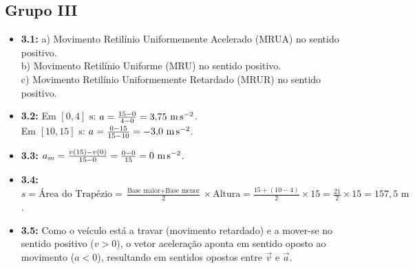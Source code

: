 \documentclass[11pt, a4paper]{article}
\begin{document}
\subsection*{Grupo III}
\begin{itemize}[leftmargin=1.5em]
  \item \textbf{3.1:} 
    a) Movimento Retilínio Uniformemente Acelerado (MRUA) no sentido positivo. \\
    b) Movimento Retilínio Uniforme (MRU) no sentido positivo. \\
    c) Movimento Retilínio Uniformemente Retardado (MRUR) no sentido positivo.
  \item \textbf{3.2:} 
    Em $[0, 4]\text{ s}$: $a = \frac{15 - 0}{4 - 0} = 3{,}75\text{ m\,s}^{-2}$. \\
    Em $[10, 15]\text{ s}$: $a = \frac{0 - 15}{15 - 10} = -3{,}0\text{ m\,s}^{-2}$.
  \item \textbf{3.3:} $a_m = \frac{v(15) - v(0)}{15 - 0} = \frac{0 - 0}{15} = 0\text{ m\,s}^{-2}$.
  \item \textbf{3.4:} $s = \text{Área do Trapézio} = \frac{\text{Base maior} + \text{Base menor}}{2} \times \text{Altura} = \frac{15 + (10 - 4)}{2} \times 15 = \frac{21}{2} \times 15 = 157{,}5\text{ m}$.
  \item \textbf{3.5:} Como o veículo está a travar (movimento retardado) e a mover-se no sentido positivo ($v > 0$), o vetor aceleração aponta em sentido oposto ao movimento ($a < 0$), resultando em sentidos opostos entre $\vec{v}$ e $\vec{a}$.
\end{itemize}
\end{document}
